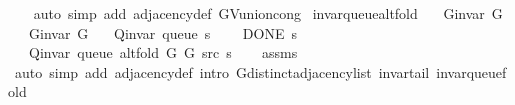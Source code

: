 \begin{isabellebody}
\ \ \isamarkupfalse%
\ {\isacharparenleft}{\kern0pt}auto\ simp\ add{\isacharcolon}{\kern0pt}\ adjacency{\isacharunderscore}{\kern0pt}def\ G{\isachardot}{\kern0pt}V{\isacharunderscore}{\kern0pt}union{\isacharunderscore}{\kern0pt}cong{\isacharparenright}{\kern0pt}%
\endisatagproof
{\isafoldproof}%
%
\isadelimproof
%
\endisadelimproof
%
\isadelimdocument
%
\endisadelimdocument
%
\isatagdocument
%
\isamarkuptrue%
%
\isamarkuptrue%
%
\isamarkuptrue%
%
\endisatagdocument
{\isafolddocument}%
%
\isadelimdocument
%
\endisadelimdocument
{}\isamarkupfalse%
\ invar{\isacharunderscore}{\kern0pt}queue{\isacharunderscore}{\kern0pt}alt{\isacharunderscore}{\kern0pt}fold{\isacharcolon}{\kern0pt}\isanewline
\ \ \ {\isachardoublequoteopen}G{\isachardot}{\kern0pt}invar\ G{}{\isachardoublequoteclose}\isanewline
\ \ \ {\isachardoublequoteopen}G{\isachardot}{\kern0pt}invar\ G{}{\isachardoublequoteclose}\isanewline
\ \ \ {\isachardoublequoteopen}Q{\isacharunderscore}{\kern0pt}invar\ {\isacharparenleft}{\kern0pt}queue\ s{\isacharparenright}{\kern0pt}{\isachardoublequoteclose}\isanewline
\ \ \ {\isachardoublequoteopen}{\isasymnot}\ DONE\ s{\isachardoublequoteclose}\isanewline
\ \ \ {\isachardoublequoteopen}Q{\isacharunderscore}{\kern0pt}invar\ {\isacharparenleft}{\kern0pt}queue\ {\isacharparenleft}{\kern0pt}alt{\isacharunderscore}{\kern0pt}fold\ G{}\ G{}\ src\ s{\isacharparenright}{\kern0pt}{\isacharparenright}{\kern0pt}{\isachardoublequoteclose}\isanewline
%
\isadelimproof
\ \ %
\endisadelimproof
%
\isatagproof
{}\isamarkupfalse%
\ assms\isanewline
\ \ \isamarkupfalse%
\ {\isacharparenleft}{\kern0pt}auto\ simp\ add{\isacharcolon}{\kern0pt}\ adjacency{\isacharunderscore}{\kern0pt}def\ intro{\isacharcolon}{\kern0pt}\ G{\isachardot}{\kern0pt}distinct{\isacharunderscore}{\kern0pt}adjacency{\isacharunderscore}{\kern0pt}list\ invar{\isacharunderscore}{\kern0pt}tail\ invar{\isacharunderscore}{\kern0pt}queue{\isacharunderscore}{\kern0pt}fold{\isacharparenright}{\kern0pt}%
\endisatagproof
{\isafoldproof}%
%
\isadelimproof
%
\endisadelimproof
%
\isadelimdocument
%
\endisadelimdocument
%
\isatagdocument
%
\isamarkuptrue%

\end{isabellebody}
